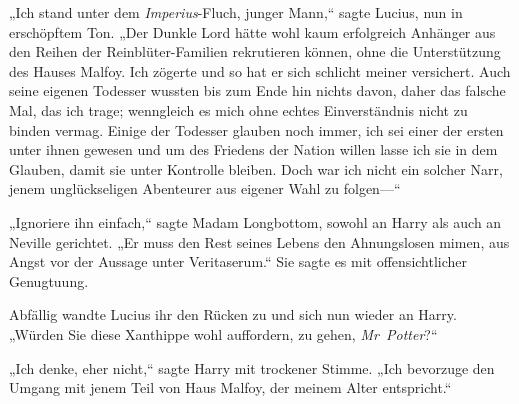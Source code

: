 „Ich stand unter dem \emph{Imperius}-Fluch, junger Mann,“ sagte Lucius, nun in erschöpftem Ton. „Der Dunkle Lord hätte wohl kaum erfolgreich Anhänger aus den Reihen der Reinblüter-Familien rekrutieren können, ohne die Unterstützung des Hauses Malfoy. Ich zögerte und so hat er sich schlicht meiner versichert. Auch seine eigenen Todesser wussten bis zum Ende hin nichts davon, daher das falsche Mal, das ich trage; wenngleich es mich ohne echtes Einverständnis nicht zu binden vermag. Einige der Todesser glauben noch immer, ich sei einer der ersten unter ihnen gewesen und um des Friedens der Nation willen lasse ich sie in dem Glauben, damit sie unter Kontrolle bleiben. Doch war ich nicht ein solcher Narr, jenem unglückseligen Abenteurer aus eigener Wahl zu folgen—“

„Ignoriere ihn einfach,“ sagte Madam Longbottom, sowohl an Harry als auch an Neville gerichtet. „Er muss den Rest seines Lebens den Ahnungslosen mimen, aus Angst vor der Aussage unter Veritaserum.“ Sie sagte es mit offensichtlicher Genugtuung.

Abfällig wandte Lucius ihr den Rücken zu und sich nun wieder an Harry. „Würden Sie diese Xanthippe wohl auffordern, zu gehen, \emph{Mr~Potter}?“

„Ich denke, eher nicht,“ sagte Harry mit trockener Stimme. „Ich bevorzuge den Umgang mit jenem Teil von Haus Malfoy, der meinem Alter entspricht.“

